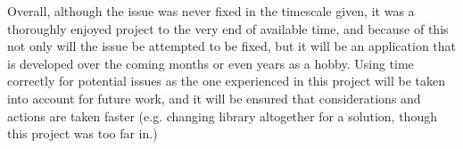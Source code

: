 Overall, although the issue was never fixed in the timescale given, it was a thoroughly enjoyed project to the very end of available time, and because of this not only will the issue be attempted to be fixed, but it will be an application that is developed over the coming months or even years as a hobby. Using time correctly for potential issues as the one experienced in this project will be taken into account for future work, and it will be ensured that considerations and actions are taken faster (e.g. changing library altogether for a solution, though this project was too far in.)

\clearpage

\newpage\mbox{}\newpage